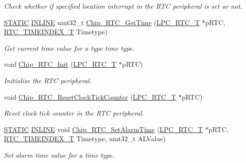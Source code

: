 \begin{DoxyCompactItemize}
\begin{DoxyCompactList}\small\item\em Check whether if specified location interrupt in the R\+TC peripheral is set or not. \end{DoxyCompactList}\item 
\hyperlink{group__LPC__Types__Public__Macros_ga10b2d890d871e1489bb02b7e70d9bdfb}{S\+T\+A\+T\+IC} \hyperlink{group__LPC__Types__Public__Types_ga2eb6f9e0395b47b8d5e3eeae4fe0c116}{I\+N\+L\+I\+NE} uint32\+\_\+t \hyperlink{group__RTC__17XX__40XX_ga661c73c8fce7243b30a207ad7cbee59b}{Chip\+\_\+\+R\+T\+C\+\_\+\+Get\+Time} (\hyperlink{structLPC__RTC__T}{L\+P\+C\+\_\+\+R\+T\+C\+\_\+T} $\ast$p\+R\+TC, \hyperlink{group__RTC__17XX__40XX_ga8144898fe628404d396db06dc8aac0e0}{R\+T\+C\+\_\+\+T\+I\+M\+E\+I\+N\+D\+E\+X\+\_\+T} Timetype)
\begin{DoxyCompactList}\small\item\em Get current time value for a type time type. \end{DoxyCompactList}\item 
void \hyperlink{group__RTC__17XX__40XX_gac37fe41fed088f1336797e05674125ff}{Chip\+\_\+\+R\+T\+C\+\_\+\+Init} (\hyperlink{structLPC__RTC__T}{L\+P\+C\+\_\+\+R\+T\+C\+\_\+T} $\ast$p\+R\+TC)
\begin{DoxyCompactList}\small\item\em Initialize the R\+TC peripheral. \end{DoxyCompactList}\item 
void \hyperlink{group__RTC__17XX__40XX_ga1d569e8d5d570f6c79d2d1f803bb5f7c}{Chip\+\_\+\+R\+T\+C\+\_\+\+Reset\+Clock\+Tick\+Counter} (\hyperlink{structLPC__RTC__T}{L\+P\+C\+\_\+\+R\+T\+C\+\_\+T} $\ast$p\+R\+TC)
\begin{DoxyCompactList}\small\item\em Reset clock tick counter in the R\+TC peripheral. \end{DoxyCompactList}\item 
\hyperlink{group__LPC__Types__Public__Macros_ga10b2d890d871e1489bb02b7e70d9bdfb}{S\+T\+A\+T\+IC} \hyperlink{group__LPC__Types__Public__Types_ga2eb6f9e0395b47b8d5e3eeae4fe0c116}{I\+N\+L\+I\+NE} void \hyperlink{group__RTC__17XX__40XX_ga7ac6a9a813f710e8e93c4b598a14a795}{Chip\+\_\+\+R\+T\+C\+\_\+\+Set\+Alarm\+Time} (\hyperlink{structLPC__RTC__T}{L\+P\+C\+\_\+\+R\+T\+C\+\_\+T} $\ast$p\+R\+TC, \hyperlink{group__RTC__17XX__40XX_ga8144898fe628404d396db06dc8aac0e0}{R\+T\+C\+\_\+\+T\+I\+M\+E\+I\+N\+D\+E\+X\+\_\+T} Timetype, uint32\+\_\+t A\+L\+Value)
\begin{DoxyCompactList}\small\item\em Set alarm time value for a time type. \end{DoxyCompactList}\item 

\end{DoxyCompactItemize}
